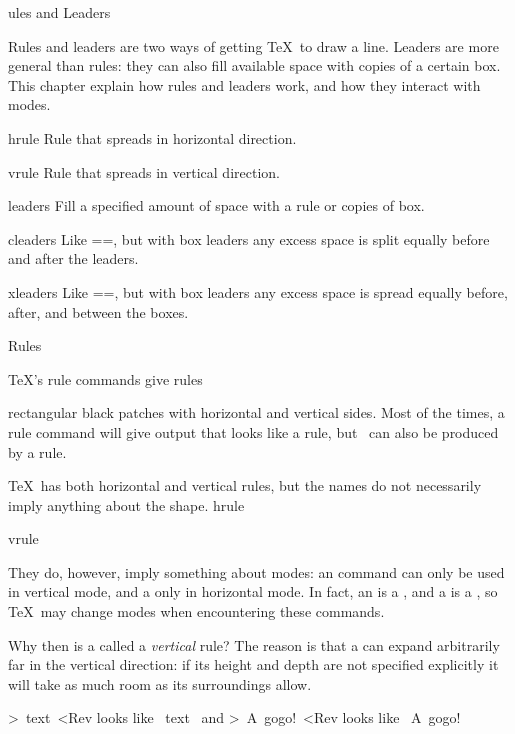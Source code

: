 \subject[rules]  Rules and Leaders

Rules and leaders are two ways of getting \TeX\ to draw a line.
Leaders are more general than rules: they can also fill
available space with copies of a certain box. This chapter
explain how rules and leaders work, and how they interact with modes.


\invent
\item hrule 
      Rule that spreads in horizontal direction.

\item vrule 
      Rule that spreads in vertical direction.

\item leaders 
      Fill a specified amount of space with a rule or copies of box.

\item cleaders 
      Like \ver=\leaders=, but with box leaders 
      any excess space is split equally before and after the leaders.

\item xleaders 
      Like \ver=\leaders=, but with box leaders any excess space is 
      spread equally before, after, and between the boxes.

\inventstop

\point Rules

\TeX's rule commands give
\term rules\par
rectangular black patches with horizontal and vertical sides.
Most of the times, a rule command will give output that
looks like a rule, but~\hbox{\vrule height 1.5ex width 1.5ex}
can also be produced by a rule.

\TeX\ has both horizontal and vertical rules, 
but the names do not necessarily imply anything about the shape.
\csterm hrule\par\csterm vrule\par
They do, however, imply something about modes:
an  command can only be used in vertical mode,
and a  only in horizontal mode.
In fact, an  is a , and a 
is a , so \TeX\ may change
modes when encountering these commands.

Why then is a  called a {\em vertical\/} rule?
The reason is that a  can expand arbitrarily
far in the vertical direction: if its height and depth are not
specified explicitly it will take as much room as its
surroundings allow\altt.

\example \Ver>\hbox{\vrule\ text \vrule}<Rev
looks like \disp\leavevmode\hbox{\vrule\ text \vrule}\dispstop
and \Ver>\hbox{\vrule\ A gogo! \vrule}<Rev looks like
\disp\leavevmode\hbox{\vrule\ A gogo! \vrule}\dispstop
\>

